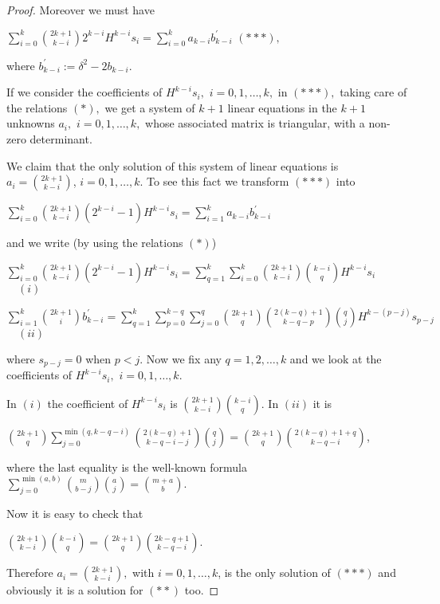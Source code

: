 \documentclass{amsart}
\theoremstyle{definition}
\begin{document}
\begin{proof}
Moreover we must have

\begin{center}
$\sum\limits_{i=0}^{k}\binom{2k+1}{k-i}2^{k-i}H^{k-i}s_{i}=\sum\limits_{i=0}^{k}a_{k-i}b_{k-i}^{\prime }$ \qquad $(***),$
\end{center}
where $b_{k-i}^{\prime }:=\delta ^{2}-2b_{k-i}.$

If we consider the coefficients of $H^{k-i}s_{i},$ $i=0,1,\dots,k,$
in $(***),$ taking care of the relations $(*),$ we get a system of
$k+1$ linear equations in the $k+1$ unknowns $a_{i},$
$i=0,1,\dots,k,$ whose associated matrix is triangular, with a
non-zero determinant.

We claim that the only solution of this system of linear equations
is $a_{i}=\binom{2k+1}{k-i}$, $i=0,1,\dots,k$. To see this fact we
transform $(***)$ into

\begin{center}
$\sum\limits_{i=0}^{k}\binom{2k+1}{k-i}(2^{k-i}-1)H^{k-i}s_{i}=\sum\limits_{i=1}^{k}a_{k-i}b_{k-i}^{\prime }$
\end{center}
and we write (by using the relations $(*)$)

\begin{center}
$\sum\limits_{i=0}^{k}\binom{2k+1}{k-i}(2^{k-i}-1)H^{k-i}s_{i}=\sum\limits_{q=1}^{k}\sum\limits_{i=0}^{k}\binom{2k+1}{k-i}\binom{k-i}{q}H^{k-i}s_{i}$ $\quad (i)$

$\sum\limits_{i=1}^{k}\binom{2k+1}{i}b_{k-i}^{\prime
}=\sum\limits_{q=1}^{k}\sum\limits_{p=0}^{k-q}\sum\limits_{j=0}^{q}\binom{2k+1}{q}\binom{2(k-q)+1}{k-q-p}\binom{q}{j}H^{k-(p-j)}s_{p-j}$ $\quad (ii)$
\end{center}
where $s_{p-j}=0$ when $p<j.$ Now we fix any $q=1,2,\dots,k$ and we
look at the coefficients of $H^{k-i}s_{i},$ $i=0,1,\dots,k.$

In $(i)$ the coefficient of $H^{k-i}s_{i}$ is
$\binom{2k+1}{k-i}\binom{k-i}{q}$. In $(ii)$ it is

\begin{center}
$\binom{2k+1}{q}\sum\limits_{j=0}^{\min (q,k-q-i)}\binom{2(k-q)+1}{k-q-i-j}\binom{q}{j}=\binom{2k+1}{q}\binom{2(k-q)+1+q}{k-q-i}$,
\end{center}
where the last equality is the well-known formula
$\sum\limits_{j=0}^{\min
(a,b)}\binom{m}{b-j}\binom{a}{j}=\binom{m+a}{b}$.

Now it is easy to check that

\begin{center}
$\binom{2k+1}{k-i}\binom{k-i}{q}=\binom{2k+1}{q}\binom{2k-q+1}{k-q-i}.$
\end{center}

Therefore $a_{i}=\binom{2k+1}{k-i},$ with $i=0,1,\dots,k$, is the
only solution of $(***)$ and obviously it is a solution for $(**)$
too.
\end{proof}
\end{document}
